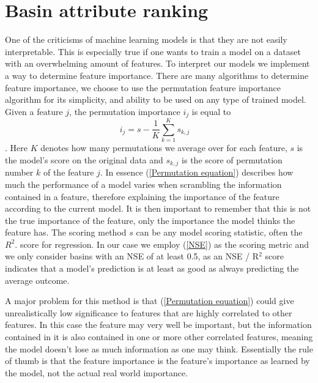 \section{Basin attribute ranking}
\label{Feature selection}
One of the criticisms of machine learning models
is that they are not easily interpretable. This 
is especially true if one wants to train a model 
on a dataset with an overwhelming amount of 
features. 
 To interpret our models we implement a way to determine feature importance. There 
are many algorithms to determine feature importance, we choose to use the permutation 
feature importance algorithm for its simplicity, and ability to be used on any type of trained model.
Given a feature $j$, the permutation importance 
$i_j$ is equal to 
\begin{equation}
i_j = s - \frac{1}{K} \sum_{k=1}^K s_{k,j}\quad 
\label{Permutation equation}
\end{equation}
\citep{permutation,breiman2001random}.
Here $K$ denotes how many permutations we average over for each feature, $s$ is
the model's score on the original data and $s_{k,j}$ is the score of permutation 
number $k$ of the feature $j$. In essence (\ref{Permutation equation}) describes 
how much the performance of a model varies when scrambling the information 
contained in a feature, therefore explaining the importance of the feature 
according to the current model. It is then important to remember that this is not 
the true importance of the feature, only the importance the model thinks the feature 
has. The scoring method $s$ can be any model scoring statistic, often the $R^2$. 
score for regression.
In our case we employ (\ref{NSE}) as the scoring metric and we only consider basins 
with an NSE of at least 0.5, as an NSE / R$^2$ score indicates that a model's 
prediction is at least as good as always predicting the average outcome.

A major problem for this method is that (\ref{Permutation equation}) could give 
unrealistically low significance to features that are highly correlated to other 
features. In this case the feature may very well be important, but the information 
contained in it is also contained in one or more other correlated features, meaning 
the model doesn't lose as much information as one may think. Essentially the rule 
of thumb is that the feature importance is the feature's importance as learned by 
the model, not the actual real world importance. 

